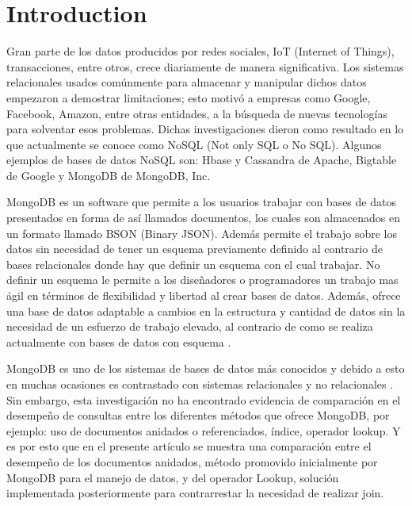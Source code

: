 \documentclass[conference,compsoc]{sty/IEEEtran}
\begin{document}
\section{Introduction}
Gran parte de los datos producidos por redes sociales, IoT (Internet of Things), transacciones, entre otros, crece diariamente de manera significativa. Los sistemas relacionales usados comúnmente para almacenar y manipular dichos datos empezaron a demostrar limitaciones; esto motivó a empresas como Google, Facebook, Amazon, entre otras entidades, a la búsqueda de nuevas tecnologías para solventar esos problemas. Dichas investigaciones dieron como resultado en lo que actualmente se conoce como NoSQL (Not only SQL o No SQL). Algunos ejemplos de bases de datos NoSQL son: Hbase \cite{Hbase} y Cassandra \cite{Cassandra} de Apache, Bigtable \cite{Bigtable} de Google y MongoDB \cite{MongoInAction} de MongoDB, Inc. 

MongoDB es un software que permite a los usuarios trabajar con bases de datos presentados en forma de así llamados documentos, los cuales son almacenados en un formato llamado BSON (Binary JSON). Además permite el trabajo sobre los datos sin necesidad de tener un esquema previamente definido al contrario de bases relacionales donde hay que definir un esquema con el cual trabajar. No definir un esquema le permite a los diseñadores o programadores un trabajo mas ágil en términos de flexibilidad y libertad al crear bases de datos. Además, ofrece una base de datos adaptable a cambios en la estructura y cantidad de datos sin la necesidad de un esfuerzo de trabajo elevado, al contrario de como se realiza actualmente con bases de datos con esquema \cite{esquema}.

MongoDB es uno de los sistemas de bases de datos más conocidos y debido a esto en muchas ocasiones es contrastado con sistemas relacionales \cite{CRUDMongoMySQL, MongoDBvsOracle} y no relacionales \cite{MongovsCassandravsCouch,NoSQLDatabases}. Sin embargo, esta investigación no ha encontrado evidencia de comparación en el desempeño de consultas entre los diferentes métodos que ofrece MongoDB, por ejemplo: uso de documentos anidados o referenciados, índice, operador lookup. Y es por esto que en el presente artículo se muestra una comparación entre el desempeño de los documentos anidados, método promovido inicialmente por MongoDB para el manejo de datos, y del operador Lookup, solución implementada posteriormente para contrarrestar la necesidad de realizar join. 

\end{document}
